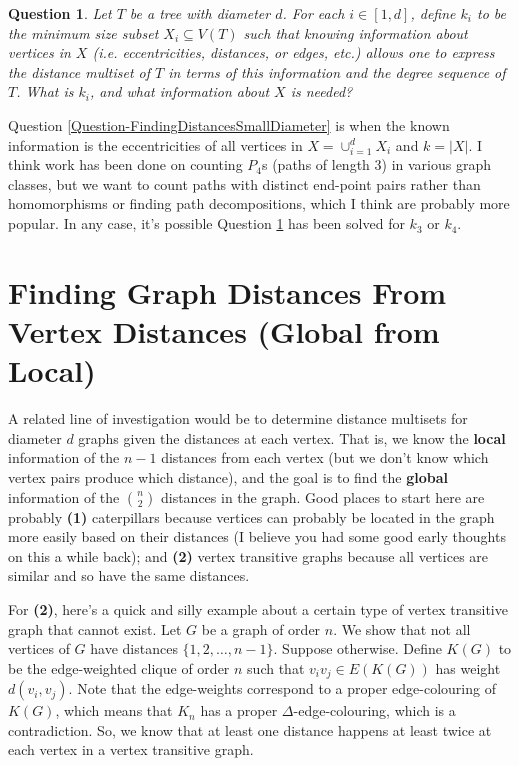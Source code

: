\documentclass[12]{article}
\newtheorem{question}{Question}
\theoremstyle{definition}
\begin{document}
	\begin{question}\label{Question-FindingMult(i)SmallDiameter}
		Let $T$ be a tree with diameter $d$.  For each $i \in [1,d]$, define $k_i$ to be the minimum size subset $X_i \subseteq V(T)$ such that knowing information about vertices in $X$ (\textit{i.e.} eccentricities, distances, or edges, etc.) allows one to express the distance multiset of $T$ in terms of this information and the degree sequence of $T$.  What is $k_i$, and what information about $X$ is needed?
	\end{question}

	Question \ref{Question-FindingDistancesSmallDiameter} is when the known information is the eccentricities of all vertices in $X = \cup_{i=1}^d X_i$ and $k = |X|$.  I think work has been done on counting $P_4$s (paths of length $3$) in various graph classes, but we want to count paths with distinct end-point pairs rather than homomorphisms or finding path decompositions, which I think are probably more popular.  In any case, it's possible Question \ref{Question-FindingMult(i)SmallDiameter} has been solved for $k_3$ or $k_4$.
	
	\section{Finding Graph Distances From Vertex Distances (Global from Local)} A related line of investigation would be to determine distance multisets for diameter $d$ graphs given the distances at each vertex.  That is, we know the \textbf{local} information of the $n-1$ distances from each vertex (but we don't know which vertex pairs produce which distance), and the goal is to find the \textbf{global} information of the ${n \choose 2}$ distances in the graph.  Good places to start here are probably \textbf{(1)} caterpillars because vertices can probably be located in the graph more easily based on their distances (I believe you had some good early thoughts on this a while back); and \textbf{(2)} vertex transitive graphs because all vertices are similar and so have the same distances.
	
	For \textbf{(2)}, here's a quick and silly example about a certain type of vertex transitive graph that cannot exist.  Let $G$ be a graph of order $n$.  We show that not all vertices of $G$ have distances $\{1, 2, \ldots, n-1\}$.  Suppose otherwise.  Define $K(G)$ to be the edge-weighted clique of order $n$ such that $v_iv_j \in E(K(G))$ has weight $d(v_i,v_j)$.  Note that the edge-weights correspond to a proper edge-colouring of $K(G)$, which means that $K_n$ has a proper $\Delta$-edge-colouring, which is a contradiction.  So, we know that at least one distance happens at least twice at each vertex in a vertex transitive graph.
	
\end{document}

